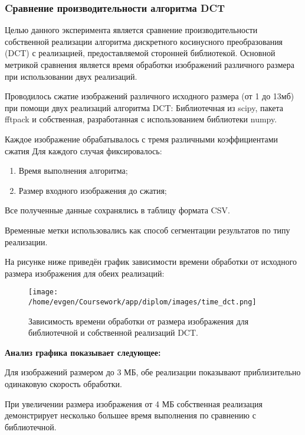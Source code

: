 \subsubsection{Cравнение производительности алгоритма DCT}

Целью данного эксперимента является сравнение производительности собственной реализации алгоритма 
дискретного косинусного преобразования (DCT) с реализацией, предоставляемой сторонней библиотекой. 
Основной метрикой сравнения является время обработки изображений различного размера при использовании 
двух реализаций.

Проводилось сжатие изображений различного исходного размера (от 1 до 13мб) при помощи двух реализаций алгоритма DCT:
Библиотечная из scipy, пакета fftpack и собственная, разработанная с использованием библиотеки numpy.

Каждое изображение обрабатывалось с тремя различными коэффициентами сжатия
Для каждого случая фиксировалось:
\begin{enumerate}
    \item Время выполнения алгоритма;
    \item Размер входного изображения до сжатия;
\end{enumerate}

Все полученные данные сохранялись в таблицу формата CSV. 
\TimeDCTlib

\TimeDCTown

\FloatBarrier

Временные метки использовались как способ сегментации результатов по типу реализации.

На рисунке ниже приведён график зависимости времени обработки 
от исходного размера изображения для обеих реализаций:

\begin{figure}[H]
    \centering
    \texttt{[image: /home/evgen/Coursework/app/diplom/images/time\_dct.png]}
    \caption{Зависимость времени обработки от размера изображения для библиотечной и собственной реализаций DCT.}
    \label{fig:time_dct}
\end{figure}

\textbf{Анализ графика показывает следующее:}

Для изображений размером до 3 МБ, обе реализации показывают приблизительно одинаковую скорость обработки.

При увеличении размера изображения от 4 МБ собственная реализация демонстрирует несколько большее время 
выполнения по сравнению с библиотечной.

